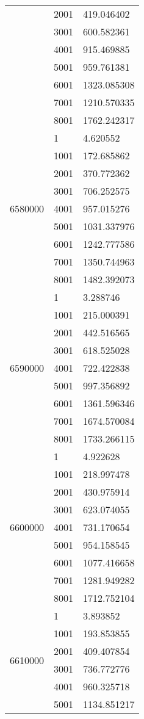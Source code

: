 \begin{table}[htb!]
\begin{tabular}{lll}
 & 2001 & 419.046402 \\
 & 3001 & 600.582361 \\
 & 4001 & 915.469885 \\
 & 5001 & 959.761381 \\
 & 6001 & 1323.085308 \\
 & 7001 & 1210.570335 \\
 & 8001 & 1762.242317 \\
\multirow[c]{9}{*}{6580000} & 1 & 4.620552 \\
 & 1001 & 172.685862 \\
 & 2001 & 370.772362 \\
 & 3001 & 706.252575 \\
 & 4001 & 957.015276 \\
 & 5001 & 1031.337976 \\
 & 6001 & 1242.777586 \\
 & 7001 & 1350.744963 \\
 & 8001 & 1482.392073 \\
\multirow[c]{9}{*}{6590000} & 1 & 3.288746 \\
 & 1001 & 215.000391 \\
 & 2001 & 442.516565 \\
 & 3001 & 618.525028 \\
 & 4001 & 722.422838 \\
 & 5001 & 997.356892 \\
 & 6001 & 1361.596346 \\
 & 7001 & 1674.570084 \\
 & 8001 & 1733.266115 \\
\multirow[c]{9}{*}{6600000} & 1 & 4.922628 \\
 & 1001 & 218.997478 \\
 & 2001 & 430.975914 \\
 & 3001 & 623.074055 \\
 & 4001 & 731.170654 \\
 & 5001 & 954.158545 \\
 & 6001 & 1077.416658 \\
 & 7001 & 1281.949282 \\
 & 8001 & 1712.752104 \\
\multirow[c]{9}{*}{6610000} & 1 & 3.893852 \\
 & 1001 & 193.853855 \\
 & 2001 & 409.407854 \\
 & 3001 & 736.772776 \\
 & 4001 & 960.325718 \\
 & 5001 & 1134.851217 \\

\end{tabular}
\end{table}
